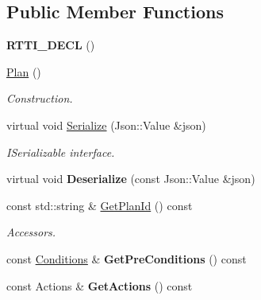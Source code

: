 \subsection*{Public Member Functions}
\begin{DoxyCompactItemize}
\item 
\mbox{\label{class_plan_acfbb87d5cde05ca5cf44818ae468a26d}} 
{\bfseries R\+T\+T\+I\+\_\+\+D\+E\+CL} ()
\item 
\mbox{\label{class_plan_a031ab495af5a99a883be2e09860086f1}} 
\hyperlink{class_plan_a031ab495af5a99a883be2e09860086f1}{Plan} ()
\begin{DoxyCompactList}\small\item\em Construction. \end{DoxyCompactList}\item 
\mbox{\label{class_plan_ae85758b24127c3c0035cf23b3d867602}} 
virtual void \hyperlink{class_plan_ae85758b24127c3c0035cf23b3d867602}{Serialize} (Json\+::\+Value \&json)
\begin{DoxyCompactList}\small\item\em I\+Serializable interface. \end{DoxyCompactList}\item 
\mbox{\label{class_plan_a86061b79dfe7c42aa6a80cff309b172d}} 
virtual void {\bfseries Deserialize} (const Json\+::\+Value \&json)
\item 
\mbox{\label{class_plan_ab57cc9df6f7a78b58f7c91e9ab40738e}} 
const std\+::string \& \hyperlink{class_plan_ab57cc9df6f7a78b58f7c91e9ab40738e}{Get\+Plan\+Id} () const
\begin{DoxyCompactList}\small\item\em Accessors. \end{DoxyCompactList}\item 
\mbox{\label{class_plan_ab9c270221705d97ff14e2a1e8baa7ac2}} 
const \hyperlink{class_plan_aa0455bd3e1ec9a820f31ef52706fdf76}{Conditions} \& {\bfseries Get\+Pre\+Conditions} () const
\item 
\mbox{\label{class_plan_ae3c1c4287e8cb6e9ab7c6d1ea5655847}} 
const Actions \& {\bfseries Get\+Actions} () const
\item 

\end{DoxyCompactItemize}
